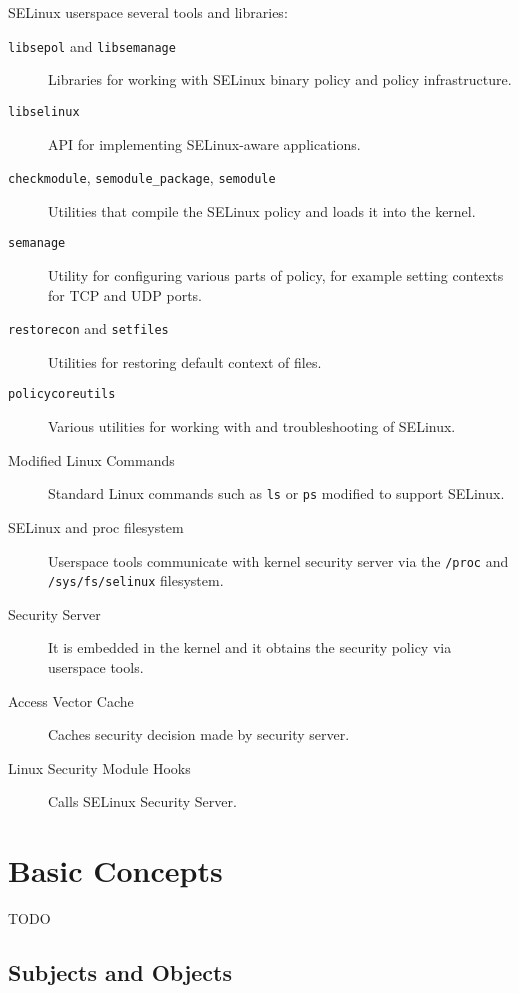 SELinux userspace several tools and libraries:
\begin{description}
    \item [\texttt{libsepol} and \texttt{libsemanage}] Libraries for working
        with SELinux binary policy and policy infrastructure.
    \item [\texttt{libselinux}] API for implementing SELinux-aware applications.
    \item [\texttt{checkmodule}, \texttt{semodule\_package}, \texttt{semodule}]
        Utilities that compile the SELinux policy and loads it into the kernel.
    \item [\texttt{semanage}] Utility for configuring various parts of policy,
        for example setting contexts for TCP and UDP ports.
    \item [\texttt{restorecon} and \texttt{setfiles}] Utilities for restoring
        default context of files.
    \item [\texttt{policycoreutils}] Various utilities for working with and
        troubleshooting of SELinux.
    \item [Modified Linux Commands] Standard Linux commands such as \texttt{ls}
        or \texttt{ps} modified to support SELinux.
    \item [SELinux and proc filesystem] Userspace tools communicate with kernel
        security server via the \texttt{/proc} and \texttt{/sys/fs/selinux}
        filesystem.
    \item [Security Server] It is embedded in the kernel and it obtains the
        security policy via userspace tools.
    \item [Access Vector Cache] Caches security decision made by security
        server.
    \item [Linux Security Module Hooks] Calls SELinux Security Server.
\end{description}

\section{Basic Concepts}

TODO

\subsection{Subjects and Objects}

